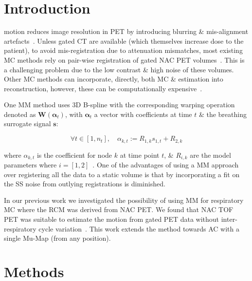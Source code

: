 \section{Introduction} \label{sec:introduction}
     motion reduces image resolution in \gls{PET} by introducing blurring \& mis-alignment artefacts~\cite{Nehmeh2008a}. Unless gated \gls{CT} are available (which themselves increase dose to the patient), to avoid mis-registration due to attenuation mismatches, most existing \gls{MC} methods rely on pair-wise registration of gated \gls{NAC} \gls{PET} volumes~\cite{LungMotionDiaphragmBaiBib}.%
    This is a challenging problem due to the low contrast \& high noise of these volumes. Other \gls{MC} methods can incorporate, directly, both \gls{MC} \&  estimation into reconstruction, however, these can be computationally expensive~\cite{Bousse2016b}.
    
    One \gls{MM} method uses \gls{3D} B-spline  with the corresponding warping operation denoted as $\mathbf{W}(\mathbf{\alpha}_t)$, with $\mathbf{\alpha}_t$ a vector with coefficients at time $t$ \& the breathing surrogate signal $\mathbf{s}$:
    
    \begin{equation}
        \forall t \in [1, n_t],\quad \alpha_{k, t} := R_{1, k} s_{1, t} + R_{2, k}
    \end{equation}
    
    \noindent where $\alpha_{k, t}$ is the coefficient for node $k$ at time point $t$, \& $R_{i, k}$ are the model parameters where $i = [1, 2]$~\cite{McClelland2017}. One of the advantages of using a \gls{MM} approach over registering all the data to a static volume is that by incorporating a fit on the \gls{SS} noise from outlying registrations is diminished.
    
    In our previous work we investigated the possibility of using \gls{MM} for respiratory \gls{MC} where the \gls{RCM} was derived from \gls{NAC} \gls{PET}. We found that \gls{NAC} \gls{TOF} \gls{PET} was suitable to estimate the motion from gated PET data without inter-respiratory cycle variation~\cite{Whitehead2019ImpactPET}. This work extends the method towards \gls{AC} with a single \gls{Mu-Map} (from any position).

\section{Methods} \label{sec:methods}
